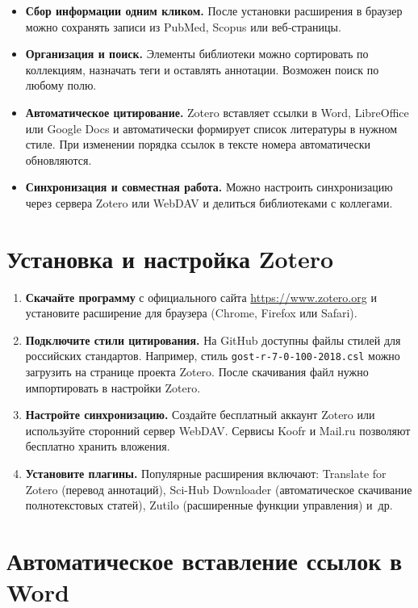 \documentclass[
  russian,
  12pt,
  a4paper,
]{article}
\providecommand{\tightlist}{%
  \setlength{\itemsep}{0pt}\setlength{\parskip}{0pt}}
\begin{document}
\begin{itemize}
\tightlist
\item
  \textbf{Сбор информации одним кликом.} После установки расширения в
  браузер можно сохранять записи из PubMed, Scopus или веб‑страницы.
\item
  \textbf{Организация и поиск.} Элементы библиотеки можно сортировать по
  коллекциям, назначать теги и оставлять аннотации. Возможен поиск по
  любому полю.
\item
  \textbf{Автоматическое цитирование.} Zotero вставляет ссылки в Word,
  LibreOffice или Google Docs и автоматически формирует список
  литературы в нужном стиле. При изменении порядка ссылок в тексте
  номера автоматически обновляются.
\item
  \textbf{Синхронизация и совместная работа.} Можно настроить
  синхронизацию через сервера Zotero или WebDAV и делиться библиотеками
  с коллегами.
\end{itemize}

\chapter{Установка и настройка
Zotero}\label{ux443ux441ux442ux430ux43dux43eux432ux43aux430-ux438-ux43dux430ux441ux442ux440ux43eux439ux43aux430-zotero}

\begin{enumerate}
\def\labelenumi{\arabic{enumi}.}
\tightlist
\item
  \textbf{Скачайте программу} с официального сайта
  \url{https://www.zotero.org} и установите расширение для браузера
  (Chrome, Firefox или Safari).
\item
  \textbf{Подключите стили цитирования.} На GitHub доступны файлы стилей
  для российских стандартов. Например, стиль
  \texttt{gost-r-7-0-100-2018.csl} можно загрузить на странице проекта
  Zotero. После скачивания файл нужно импортировать в настройки Zotero.
\item
  \textbf{Настройте синхронизацию.} Создайте бесплатный аккаунт Zotero
  или используйте сторонний сервер WebDAV. Сервисы Koofr и Mail.ru
  позволяют бесплатно хранить вложения.
\item
  \textbf{Установите плагины.} Популярные расширения включают: Translate
  for Zotero (перевод аннотаций), Sci-Hub Downloader (автоматическое
  скачивание полнотекстовых статей), Zutilo (расширенные функции
  управления) и~др.
\end{enumerate}

\chapter{Автоматическое вставление ссылок в
Word}\label{ux430ux432ux442ux43eux43cux430ux442ux438ux447ux435ux441ux43aux43eux435-ux432ux441ux442ux430ux432ux43bux435ux43dux438ux435-ux441ux441ux44bux43bux43eux43a-ux432-word}
\end{document}
